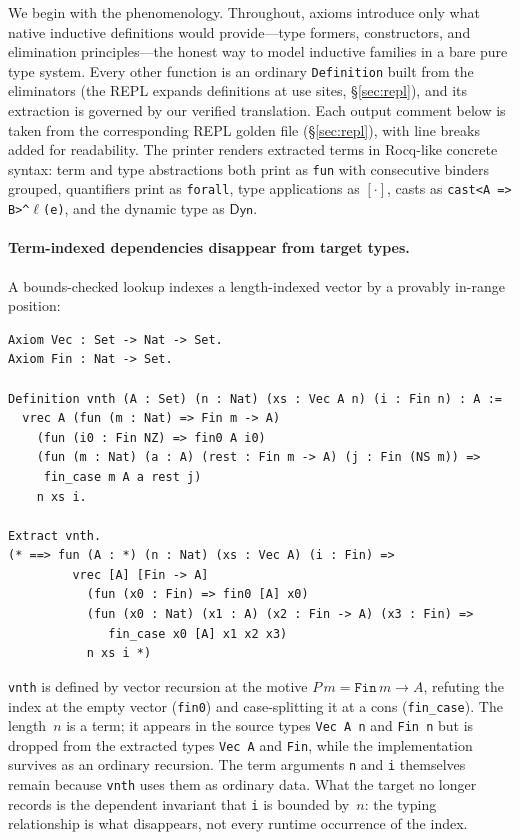 \documentclass[acmsmall,anonymous=false,nonacm]{acmart}
\newcommand{\dyn}{\ensuremath{\mathsf{Dyn}}}
\begin{document}
We begin with the phenomenology. Throughout, axioms introduce only what native
inductive definitions would provide---type formers, constructors, and
elimination principles---the honest way to model inductive families in a bare
pure type system. Every other function is an ordinary \texttt{Definition}
built from the eliminators (the REPL expands definitions at use sites,
\S\ref{sec:repl}), and its extraction is governed by our verified
translation. Each output comment below is taken
from the corresponding REPL golden file (\S\ref{sec:repl}), with line breaks
added for readability. The
printer renders extracted terms in Rocq-like concrete syntax: term and type
abstractions both print as \texttt{fun} with consecutive binders grouped,
quantifiers print as \texttt{forall}, type applications as $[\cdot]$, casts as
\texttt{cast<A => B>\^{}$\ell$(e)}, and the dynamic type as $\dyn$.

\paragraph{Term-indexed dependencies disappear from target types.}
A bounds-checked lookup indexes a length-indexed vector by a provably in-range
position:
\begin{lstlisting}
Axiom Vec : Set -> Nat -> Set.
Axiom Fin : Nat -> Set.

Definition vnth (A : Set) (n : Nat) (xs : Vec A n) (i : Fin n) : A :=
  vrec A (fun (m : Nat) => Fin m -> A)
    (fun (i0 : Fin NZ) => fin0 A i0)
    (fun (m : Nat) (a : A) (rest : Fin m -> A) (j : Fin (NS m)) =>
     fin_case m A a rest j)
    n xs i.

Extract vnth.
(* ==> fun (A : *) (n : Nat) (xs : Vec A) (i : Fin) =>
         vrec [A] [Fin -> A]
           (fun (x0 : Fin) => fin0 [A] x0)
           (fun (x0 : Nat) (x1 : A) (x2 : Fin -> A) (x3 : Fin) =>
              fin_case x0 [A] x1 x2 x3)
           n xs i *)
\end{lstlisting}
\texttt{vnth} is defined by vector recursion at the motive
$P\,m = \texttt{Fin}\,m \to A$, refuting the index at the empty vector
(\texttt{fin0}) and case-splitting it at a cons (\texttt{fin\_case}).
The length~$n$ is a term; it appears in the source types \texttt{Vec A n} and
\texttt{Fin n} but is dropped from the extracted types \texttt{Vec A} and
\texttt{Fin}, while the implementation survives as an ordinary recursion.
The term arguments \texttt{n} and \texttt{i} themselves remain
because \texttt{vnth} uses them as ordinary data.  What the target no longer
records is the dependent invariant that \texttt{i} is bounded by~$n$: the
typing relationship is what disappears, not every runtime occurrence of the
index.
\end{document}

